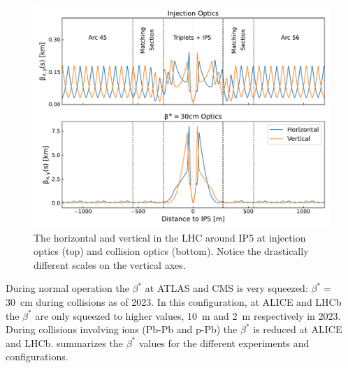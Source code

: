 \begin{figure}[!hbt]
  \centering
  \includegraphics*[width=0.99\linewidth]{Figures/Optics_Measurements_Corrections_at_LHC/ir5_surroundings_optics_2.pdf}
  \caption{The horizontal and vertical \betafunctions in the LHC around IP5 at injection optics (top) and collision optics (bottom). Notice the drastically different scales on the vertical axes.}
  \label{figure:ir5_and_around}
\end{figure}

During normal operation the \(\beta^{\ast}\) at ATLAS and CMS is very squeezed: \(\beta^{\ast} =\) \qty{30}{\centi\metre} during collisions as of \num{2023}.
In this configuration, at ALICE and LHCb the \(\beta^{\ast}\) are only squeezed to higher values, \qty{10}{\meter} and \qty{2}{\meter} respectively in \num{2023}.
During collisions involving ions (Pb-Pb and p-Pb) the \(\beta^{\ast}\) is reduced at ALICE and LHCb.
 summarizes the \(\beta^{\ast}\) values for the different experiments and configurations.

